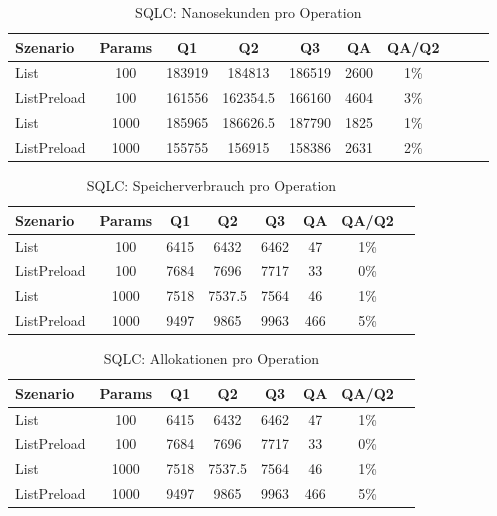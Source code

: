 
\begin{table}[ht]
\centering
\caption{SQLC: Nanosekunden pro Operation}
\begin{tabular}{lccccccccc}
\toprule
Szenario & Params & Q1 & Q2 & Q3 & QA & QA/Q2 \\
\midrule
	List & 100 & 183919 & 184813 & 186519 & 2600 & 1\% \\
	ListPreload & 100 & 161556 & 162354.5 & 166160 & 4604 & 3\% \\
	List & 1000 & 185965 & 186626.5 & 187790 & 1825 & 1\% \\
	ListPreload & 1000 & 155755 & 156915 & 158386 & 2631 & 2\% \\
\bottomrule
\end{tabular}
\label{tab:benchmark_sqlc_nsperop}
\end{table}
	
\begin{table}[ht]
\centering
\caption{SQLC: Speicherverbrauch pro Operation}
\begin{tabular}{lccccccc}
\toprule
Szenario & Params & Q1 & Q2 & Q3 & QA & QA/Q2 \\
\midrule
	List & 100 & 6415 & 6432 & 6462 & 47 & 1\% \\
	ListPreload & 100 & 7684 & 7696 & 7717 & 33 & 0\% \\
	List & 1000 & 7518 & 7537.5 & 7564 & 46 & 1\% \\
	ListPreload & 1000 & 9497 & 9865 & 9963 & 466 & 5\% \\
\bottomrule
\end{tabular}
\label{tab:benchmark_sqlc_bytesperop}
\end{table}
	
\begin{table}[ht]
\centering
\caption{SQLC: Allokationen pro Operation}
\begin{tabular}{lccccccc}
\toprule
Szenario & Params & Q1 & Q2 & Q3 & QA & QA/Q2 \\
\midrule
	List & 100 & 6415 & 6432 & 6462 & 47 & 1\% \\
	ListPreload & 100 & 7684 & 7696 & 7717 & 33 & 0\% \\
	List & 1000 & 7518 & 7537.5 & 7564 & 46 & 1\% \\
	ListPreload & 1000 & 9497 & 9865 & 9963 & 466 & 5\% \\
\bottomrule
\end{tabular}
\label{tab:benchmark_sqlc_allocsperop}
\end{table}
	